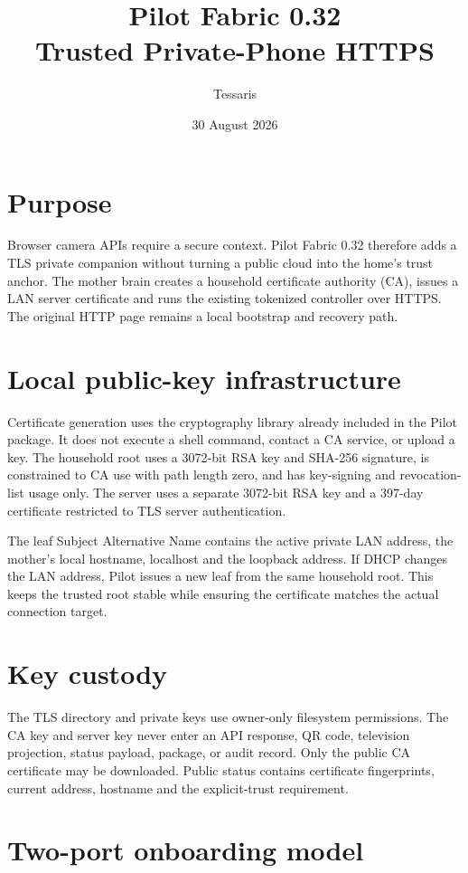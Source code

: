 \documentclass[11pt,a4paper]{article}
\title{Pilot Fabric 0.32\\Trusted Private-Phone HTTPS}
\author{Tessaris}
\date{30 August 2026}
\begin{document}
\maketitle

\section{Purpose}

Browser camera APIs require a secure context.  Pilot Fabric 0.32 therefore adds
a TLS private companion without turning a public cloud into the home's trust
anchor.  The mother brain creates a household certificate authority (CA), issues
a LAN server certificate and runs the existing tokenized controller over HTTPS.
The original HTTP page remains a local bootstrap and recovery path.

\section{Local public-key infrastructure}

Certificate generation uses the cryptography library already included in the
Pilot package.  It does not execute a shell command, contact a CA service, or
upload a key.  The household root uses a 3072-bit RSA key and SHA-256 signature,
is constrained to CA use with path length zero, and has key-signing and revocation-
list usage only.  The server uses a separate 3072-bit RSA key and a 397-day
certificate restricted to TLS server authentication.

The leaf Subject Alternative Name contains the active private LAN address, the
mother's local hostname, localhost and the loopback address.  If DHCP changes the
LAN address, Pilot issues a new leaf from the same household root.  This keeps the
trusted root stable while ensuring the certificate matches the actual connection
target.

\section{Key custody}

The TLS directory and private keys use owner-only filesystem permissions.  The
CA key and server key never enter an API response, QR code, television projection,
status payload, package, or audit record.  Only the public CA certificate may be
downloaded.  Public status contains certificate fingerprints, current address,
hostname and the explicit-trust requirement.

\section{Two-port onboarding model}
\end{document}

